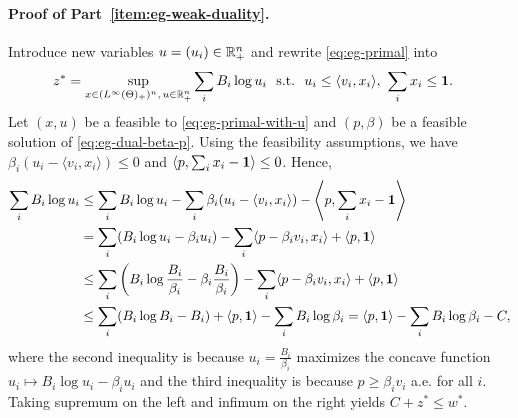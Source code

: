 	\paragraph{Proof of Part~\ref{item:eg-weak-duality}.}
	Introduce new variables $u = (u_i) \in \mathbb{R}_+^n$ and rewrite \eqref{eq:eg-primal} into 
	\begin{align}
			z^* = \sup_{x\in (L^\infty(\Theta)_+)^n,\, u\in \mathbb{R}_+^n}& \sum_i B_i \log u_i\ \
			{\rm s.t.}\  \ u_i \leq \langle v_i, x_i \rangle,\  \sum_i x_i \leq \mathbf{1}. 
		\label{eq:eg-primal-with-u}
	\end{align}
	Let $(x,u)$ be a feasible to \eqref{eq:eg-primal-with-u}
	and $(p, \beta)$ be a feasible solution of \eqref{eq:eg-dual-beta-p}. Using the feasibility assumptions, we have $\beta_i (u_i - \langle v_i, x_i \rangle) \leq 0$ and $\left\langle p, \sum_i x_i - \mathbf{1} \right\rangle \leq 0$. 
	Hence, 
	\begin{align}
		\sum_i B_i \log u_i  
		& \leq \sum_i B_i \log u_i - \sum_i \beta_i (u_i - \langle v_i, x_i\rangle) - \left\langle p, \sum_i x_i - \mathbf{1} \right\rangle \nonumber \\
		& = \sum_i (B_i \log u_i - \beta_i u_i) - \sum_i \langle p - \beta_i v_i, x_i \rangle + \langle p, \mathbf{1} \rangle \nonumber \\
		& \leq \sum_i \left(B_i \log \frac{B_i}{\beta_i} - \beta_i \frac{B_i}{\beta_i}\right) - \sum_i \langle p - \beta_i v_i, x_i \rangle + \langle p, \mathbf{1} \rangle \nonumber \\
		& \leq \sum_i (B_i \log B_i - B_i) + \langle p, \mathbf{1}\rangle - \sum_i B_i \log \beta_i = \langle p, \mathbf{1}\rangle - \sum_i B_i \log \beta_i - C,
		\label{eq:eg-weak-duality-ineq-chain}
	\end{align}
	where the second inequality is because $u_i = \frac{B_i}{\beta_i}$ maximizes the concave function 
	$ u_i \mapsto B_i \log u_i - \beta_i u_i$
	and the third inequality is because $p \geq \beta_i v_i$ a.e. for all $i$. 
	Taking supremum on the left and infimum on the right yields 
	$ C + z^* \leq w^*$.

